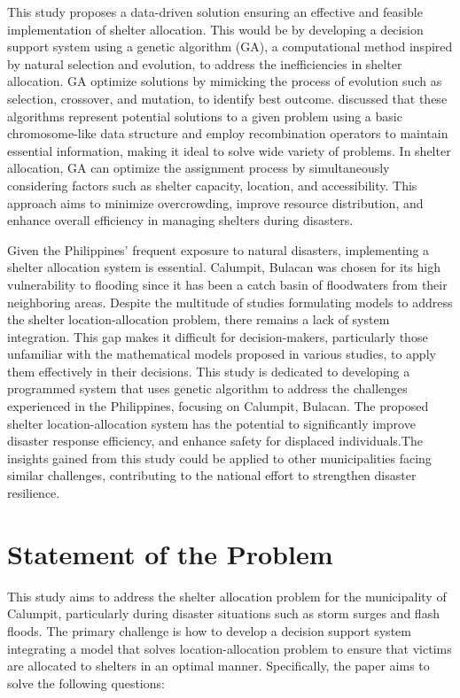 	This study proposes a data-driven solution ensuring an effective and feasible implementation of shelter allocation. This would be by developing a decision support system using a genetic algorithm (GA), a computational method inspired by natural selection and evolution, to address the inefficiencies in shelter allocation. GA optimize solutions by mimicking the process of evolution such as selection, crossover, and mutation, to identify best outcome. \textcite{Mathew2012} discussed that these algorithms represent potential solutions to a given problem using a basic chromosome-like data structure and employ recombination operators to maintain essential information, making it ideal to solve wide variety of problems. In shelter allocation, GA can optimize the assignment process by simultaneously considering factors such as shelter capacity, location, and accessibility. This approach aims to minimize overcrowding, improve resource distribution, and enhance overall efficiency in managing shelters during disasters.
		
	Given the Philippines' frequent exposure to natural disasters, implementing a shelter allocation system is essential. Calumpit, Bulacan was chosen for its high vulnerability to flooding since it has been a catch basin of floodwaters from their neighboring areas. Despite the multitude of studies formulating models to address the shelter location-allocation problem, there remains a lack of system integration. This gap makes it difficult for decision-makers, particularly those unfamiliar with the mathematical models proposed in various studies, to apply them effectively in their decisions. This study is dedicated to developing a programmed system that uses genetic algorithm to address the challenges experienced in the Philippines, focusing on Calumpit, Bulacan. The proposed shelter location-allocation system has the potential to significantly improve disaster response efficiency, and enhance safety for displaced individuals.The insights gained from this study could be applied to other municipalities facing similar challenges, contributing to the national effort to strengthen disaster resilience. 

\section{Statement of the Problem}
	This study aims to address the shelter allocation problem for the municipality of Calumpit, particularly during disaster situations such as storm surges and flash floods. The primary challenge is how to develop a decision support system integrating a model that solves location-allocation problem to ensure that victims are allocated to shelters in an optimal manner. Specifically, the paper aims to solve the following questions:
	
